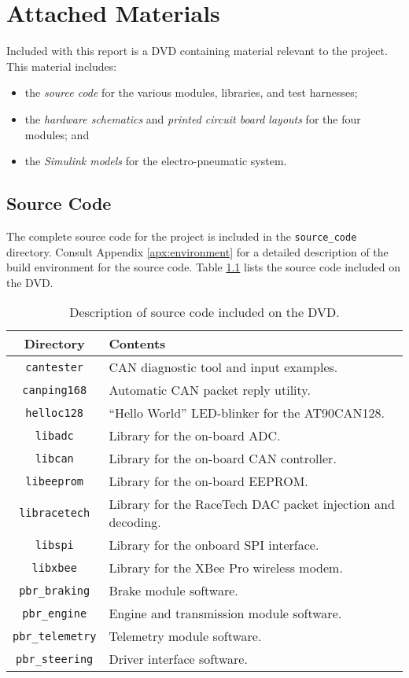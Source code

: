 \chapter{Attached Materials}

Included with this report is a DVD containing material relevant to the project. This material includes:

\begin{itemize}
	\item the \emph{source code} for the various modules, libraries, and test harnesses; 
	\item the \emph{hardware schematics} and \emph{printed circuit board layouts} for the four modules; and
	\item the \emph{Simulink models} for the electro-pneumatic system.
\end{itemize}

\section*{Source Code}

The complete source code for the project is included in the \texttt{source\_code} directory. Consult Appendix \ref{apx:environment} for a detailed description of the build environment for the source code. Table \ref{tbl:attached_source_code} lists the source code included on the DVD.

\begin{table}[H]
\caption{Description of source code included on the DVD.}
\centering
\begin{tabular}{|c|l|}
	\hline 
	Directory & Contents \\ 
	\hline
	\hline
	\texttt{cantester} & CAN diagnostic tool and input examples. \\
	\hline	
	\texttt{canping168} & {}Automatic CAN packet reply utility. \\
	\hline	
	\texttt{helloc128} & {}``Hello World'' LED-blinker for the AT90CAN128. \\ 
	\hline		
	\texttt{libadc} & Library for the on-board ADC. \\ 
	\hline		
	\texttt{libcan} & Library for the on-board CAN controller. \\ 
	\hline
	\texttt{libeeprom} & Library for the on-board EEPROM. \\ 
	\hline		
	\texttt{libracetech} & Library for the RaceTech DAC packet injection and decoding. \\ 
	\hline		
	\texttt{libspi} & Library for the onboard SPI interface. \\ 
	\hline	
	\texttt{libxbee} & Library for the XBee Pro wireless modem.  \\ 
	\hline	
	\texttt{pbr\_braking} & Brake module software. \\ 
	\hline
	\texttt{pbr\_engine} & Engine and transmission module software. \\ 
	\hline	
	\texttt{pbr\_telemetry} & Telemetry module software. \\ 
	\hline	
	\texttt{pbr\_steering} & Driver interface software. \\ 
	\hline	
\end{tabular}
\label{tbl:attached_source_code}
\end{table}

